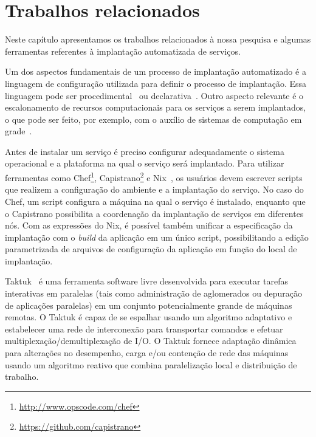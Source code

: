 
\chapter{Trabalhos relacionados}
\label{cap:relacionados}

Neste capítulo apresentamos os trabalhos relacionados à nossa pesquisa e algumas ferramentas 
referentes à implantação automatizada de serviços. 

Um dos aspectos fundamentais de um processo de implantação automatizado é a linguagem de configuração utilizada para definir o processo de implantação. Essa linguagem pode ser procedimental~\cite{Dolstra2005Configuration} ou declarativa~\cite{Magee1996Dynamic, Balter1998Olan}. Outro aspecto relevante é o escalonamento de recursos computacionais para os serviços a serem implantados, o que pode ser feito, por exemplo, com o auxílio de sistemas de computação em grade~\cite{Watson2006Dynasoar}.

Antes de instalar um serviço é preciso configurar adequadamente o sistema operacional e a plataforma na qual o serviço será implantado. Para utilizar ferramentas como Chef\footnote{\url{http://www.opscode.com/chef}}, Capistrano\footnote{\url{https://github.com/capistrano}} e Nix~\cite{Dolstra2005Configuration}, os usuários devem escrever scripts que realizem a configuração do ambiente e a implantação do serviço. No caso do Chef, um script configura a máquina na qual o serviço é instalado, enquanto que o Capistrano possibilita a coordenação da implantação de serviços em diferentes nós. Com as expressões do Nix, é possível também unificar a especificação da implantação com o \textit{build} da aplicação em um único script, possibilitando a edição parametrizada de arquivos de configuração da aplicação em função do local de implantação. 

Taktuk~\cite{Claudel2009Taktuk} é uma ferramenta software livre desenvolvida para executar
tarefas interativas em paralelas (tais como administração de aglomerados ou
depuração de aplicações paralelas) em um conjunto potencialmente grande
de máquinas remotas. O Taktuk é capaz de se espalhar usando um algoritmo adaptativo
e estabelecer uma rede de interconexão para transportar comandos
e efetuar multiplexação/demultiplexação de I/O.
O Taktuk fornece adaptação dinâmica para alterações no desempenho, carga
e/ou contenção de rede das máquinas usando um algoritmo reativo
que combina paralelização local e distribuição de trabalho.

